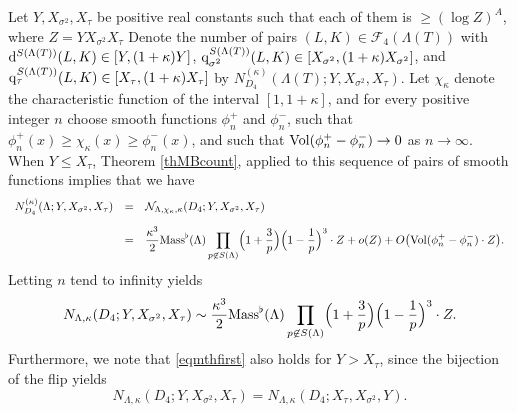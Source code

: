 \documentclass[10pt]{article}
\theoremstyle{plain}
\theoremstyle{definition}
\theoremstyle{remark}
\def\Mass{{\rm Mass}}
\def\Vol{{\rm Vol}}
\def\FF{{\mathcal F}}
\def\cN{{\mathcal N}}
\newcommand{\D}{{\rm d}}
\newcommand{\q}{{\rm q}}
\begin{document}
 Let
$Y,X_{\sigma^2},X_\tau$ be positive real constants such that each of
them is $\geq (\log Z)^A$, where $Z=YX_{\sigma^2}X_\tau$ Denote the
number of pairs $(L,K)\in\FF_4(\Lambda(T))$ with
$\D^{S(\Lambda(T))}(L,K)\in[Y,(1+\kappa)Y]$,
$\q_{\sigma^2}^{S(\Lambda(T))}(L,K)\in[X_{\sigma^2},(1+\kappa)X_{\sigma^2}]$,
and $\q_\tau^{S(\Lambda(T))}(L,K)\in[X_\tau,(1+\kappa)X_\tau]$ by
$N_{D_4}^{(\kappa)}(\Lambda(T);Y,X_{\sigma^2},X_\tau)$. Let
$\chi_\kappa$ denote the characteristic function of the interval
$[1,1+\kappa]$, and for every positive integer $n$ choose smooth
functions $\phi_n^+$ and $\phi_n^-$, such that
$\phi_n^+(x)\geq\chi_\kappa(x)\geq\phi_n^-(x)$, and such that
$\Vol(\phi_n^+-\phi_n^-)\to 0$ as $n\to\infty$. When $Y\leq X_\tau$,
Theorem \ref{thMBcount}, applied to this sequence of pairs of smooth
functions implies that we have
\begin{equation*}
\begin{array}{rcl}
\displaystyle N_{D_4}^{(\kappa)}(\Lambda;Y,X_{\sigma^2},X_\tau)
&=&\displaystyle\cN_{\Lambda,\chi_\kappa,\kappa}(D_4;Y,X_{\sigma^2},X_\tau)
\\[.15in]&=&\displaystyle
\frac{\kappa^3}{2}\Mass^\flat(\Lambda)\prod_{p\not\in S(\Lambda)}
\Bigl(1+\frac{3}{p}\Bigr)
\Bigl(1-\frac{1}{p}  \Bigr)^3
\cdot Z+o(Z)+O\bigl(\Vol(\phi_n^+-\phi_n^-)\cdot Z\bigr).
\end{array}
\end{equation*}
Letting $n$ tend to infinity yields
\begin{equation}\label{eqmthfirst}
N_{\Lambda,\kappa}(D_4;Y,X_{\sigma^2},X_\tau)\sim
\frac{\kappa^3}{2}\Mass^\flat(\Lambda)\prod_{p\not\in S(\Lambda)}
\Bigl(1+\frac{3}{p}\Bigr)
\Bigl(1-\frac{1}{p}  \Bigr)^3
\cdot Z.
\end{equation}
Furthermore, we note that \eqref{eqmthfirst} also holds for
$Y>X_\tau$, since the bijection of the flip yields
$$N_{\Lambda,\kappa}(D_4;Y,X_{\sigma^2},X_\tau)=
N_{\Lambda,\kappa}(D_4;X_\tau,X_{\sigma^2},Y).$$
\end{document}
